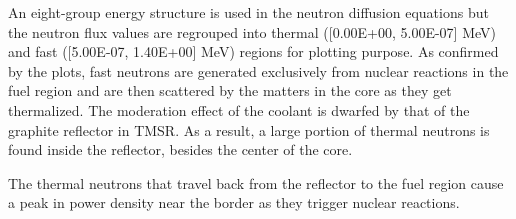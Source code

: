 \documentclass{elsarticle}
\begin{document}
An eight-group energy structure is used in the neutron diffusion equations but the neutron flux values are regrouped into thermal ([0.00E+00, 5.00E-07] MeV) and fast ([5.00E-07, 1.40E+00] MeV) regions for plotting purpose. As confirmed by the plots, fast neutrons are generated exclusively from nuclear reactions in the fuel region and are then scattered by the matters in the core as they get thermalized. 
The moderation effect of the coolant is dwarfed by that of the graphite reflector in TMSR. As a result, a large portion of thermal neutrons is found inside the reflector, besides the center of the core.

The thermal neutrons that travel back from the reflector to the fuel region cause a peak in power density near the border as they trigger nuclear reactions. 

\begin{figure}
    

\end{figure}
\end{document}
